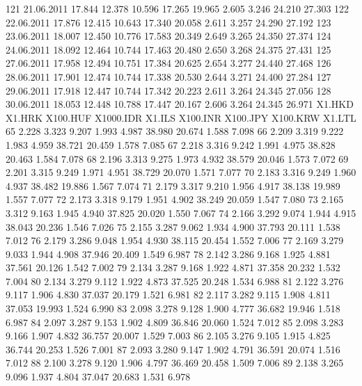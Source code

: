 \documentclass[a4paper,11pt]{scrartcl}
\begin{document}
\begin{Schunk}
\begin{Soutput}
121 21.06.2011 17.844 12.378 10.596 17.265 19.965  2.605  3.246 24.210 27.303
122 22.06.2011 17.876 12.415 10.643 17.340 20.058  2.611  3.257 24.290 27.192
123 23.06.2011 18.007 12.450 10.776 17.583 20.349  2.649  3.265 24.350 27.374
124 24.06.2011 18.092 12.464 10.744 17.463 20.480  2.650  3.268 24.375 27.431
125 27.06.2011 17.958 12.494 10.751 17.384 20.625  2.654  3.277 24.440 27.468
126 28.06.2011 17.901 12.474 10.744 17.338 20.530  2.644  3.271 24.400 27.284
127 29.06.2011 17.918 12.447 10.744 17.342 20.223  2.611  3.264 24.345 27.056
128 30.06.2011 18.053 12.448 10.788 17.447 20.167  2.606  3.264 24.345 26.971
    X1.HKD X1.HRK X100.HUF X1000.IDR X1.ILS X100.INR X100.JPY X100.KRW X1.LTL
65   2.228  3.323    9.207     1.993  4.987   38.980   20.674    1.588  7.098
66   2.209  3.319    9.222     1.983  4.959   38.721   20.459    1.578  7.085
67   2.218  3.316    9.242     1.991  4.975   38.828   20.463    1.584  7.078
68   2.196  3.313    9.275     1.973  4.932   38.579   20.046    1.573  7.072
69   2.201  3.315    9.249     1.971  4.951   38.729   20.070    1.571  7.077
70   2.183  3.316    9.249     1.960  4.937   38.482   19.886    1.567  7.074
71   2.179  3.317    9.210     1.956  4.917   38.138   19.989    1.557  7.077
72   2.173  3.318    9.179     1.951  4.902   38.249   20.059    1.547  7.080
73   2.165  3.312    9.163     1.945  4.940   37.825   20.020    1.550  7.067
74   2.166  3.292    9.074     1.944  4.915   38.043   20.236    1.546  7.026
75   2.155  3.287    9.062     1.934  4.900   37.793   20.111    1.538  7.012
76   2.179  3.286    9.048     1.954  4.930   38.115   20.454    1.552  7.006
77   2.169  3.279    9.033     1.944  4.908   37.946   20.409    1.549  6.987
78   2.142  3.286    9.168     1.925  4.881   37.561   20.126    1.542  7.002
79   2.134  3.287    9.168     1.922  4.871   37.358   20.232    1.532  7.004
80   2.134  3.279    9.112     1.922  4.873   37.525   20.248    1.534  6.988
81   2.122  3.276    9.117     1.906  4.830   37.037   20.179    1.521  6.981
82   2.117  3.282    9.115     1.908  4.811   37.053   19.993    1.524  6.990
83   2.098  3.278    9.128     1.900  4.777   36.682   19.946    1.518  6.987
84   2.097  3.287    9.153     1.902  4.809   36.846   20.060    1.524  7.012
85   2.098  3.283    9.166     1.907  4.832   36.757   20.007    1.529  7.003
86   2.105  3.276    9.105     1.915  4.825   36.744   20.253    1.526  7.001
87   2.093  3.280    9.147     1.902  4.791   36.591   20.074    1.516  7.012
88   2.100  3.278    9.120     1.906  4.797   36.469   20.458    1.509  7.006
89   2.138  3.265    9.096     1.937  4.804   37.047   20.683    1.531  6.978

\end{Soutput}
\end{Schunk}
\end{document}
